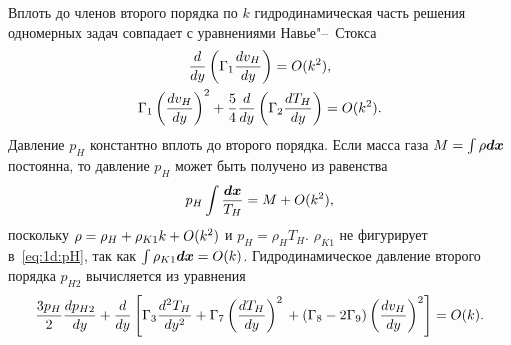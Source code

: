 Вплоть до членов второго порядка по \(k\) гидродинамическая часть решения одномерных задач
совпадает с уравнениями Навье"--~Стокса
\begin{gather}
    \der{y}\left(\Gamma_1\der[v_H]{y}\right) = \OO{k^2}, \label{eq:1d:asymptotic_v}\\
    \Gamma_1\left(\der[v_H]{y}\right)^2
        + \frac54\der{y}\left(\Gamma_2\der[T_H]{y}\right) = \OO{k^2}. \label{eq:1d:asymptotic_T}
\end{gather}
Давление \(p_H\) константно вплоть до второго порядка.
Если масса газа \(M = \int\rho\dx\) постоянна, то давление \(p_H\) может быть получено из равенства
\begin{equation}\label{eq:1d:pH}
    p_H \int\frac{\dx}{T_H} = M + \OO{k^2},
\end{equation}
поскольку \(\rho = \rho_H + \rho_{K1}k + \OO{k^2}\) и \(p_H = \rho_H T_H\).
\(\rho_{K1}\) не фигурирует в~\eqref{eq:1d:pH}, так как \(\int\rho_{K1}\dx = \OO{k}\).
Гидродинамическое давление второго порядка \(p_{H2}\) вычисляется из уравнения
\begin{equation}\label{eq:1d:pH2}
    \frac{3p_H}{2}\der[p_{H2}]{y}
        + \der{y}\left[ \Gamma_3\derdual[T_H]{y} + \Gamma_7\left(\der[T_H]{y}\right)^2 \\
            + (\Gamma_8-2\Gamma_9)\left(\der[v_H]{y}\right)^2 \right] = \OO{k}.
\end{equation}

